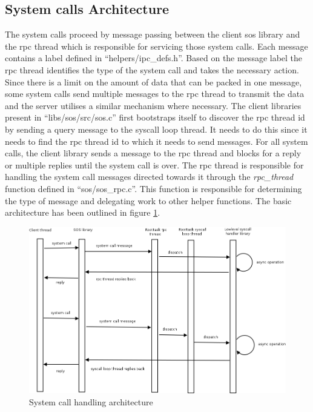 \documentclass[a4paper, 11pt]{article}
\begin{document}
\subsection{System calls Architecture}
The system calls proceed by message passing between the client sos
library and the rpc thread which is responsible for servicing those
system calls. Each message contains a label defined in
``helpers/ipc\_defs.h''. Based on the message label the rpc thread
identifies the type of the system call and takes the necessary
action. Since there is a limit on the amount of data that can be
packed in one message, some system calls send multiple messages to the
rpc thread to transmit the data and the server utilises a similar
mechanism where necessary. The client libraries present in
``libs/sos/src/sos.c'' first bootstraps itself to discover the rpc
thread id by sending a query message to the syscall loop thread. It
needs to do this since it needs to find the rpc thread id to which it
needs to send messages. For all system calls, the client library sends
a message to the rpc thread and blocks for a reply or multiple replies
until the system call is over. The rpc thread is responsible for
handling the system call messages directed towards it through the
\textit{rpc\_thread} function defined in ``sos/sos\_rpc.c''. This
function is responsible for determining the type of message and
delegating work to other helper functions. The basic architecture has
been outlined in figure \ref{systemcall-fig}.
\begin{figure}
\begin{center}
\includegraphics[scale=0.45]{systemcall.png}
\end{center}
\caption{System call handling architecture}
\label{systemcall-fig}
\end{figure}
\end{document}
